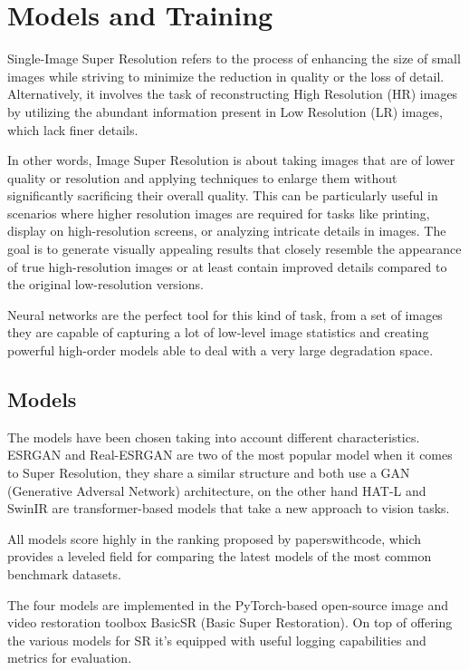 \chapter{Models and Training}
\label{cha:models_training}

Single-Image Super Resolution refers to the process of enhancing the size of small images while striving to minimize the reduction in quality or the loss of detail. Alternatively, it involves the task of reconstructing High Resolution (HR) images by utilizing the abundant information present in Low Resolution (LR) images, which lack finer details.

In other words, Image Super Resolution is about taking images that are of lower quality or resolution and applying techniques to enlarge them without significantly sacrificing their overall quality. This can be particularly useful in scenarios where higher resolution images are required for tasks like printing, display on high-resolution screens, or analyzing intricate details in images. The goal is to generate visually appealing results that closely resemble the appearance of true high-resolution images or at least contain improved details compared to the original low-resolution versions.

Neural networks are the perfect tool for this kind of task, from a set of images they are capable of capturing a lot of low-level image statistics and creating powerful high-order models able to deal with a very large degradation space.

\section{Models}
\label{sec:models}

The models have been chosen taking into account different characteristics. ESRGAN and Real-ESRGAN are two of the most popular model when it comes to Super Resolution, they share a similar structure and both use a GAN (Generative Adversal Network) architecture, on the other hand HAT-L and SwinIR are transformer-based models that take a new approach to vision tasks.

All models score highly in the ranking proposed by paperswithcode\cite{pwcode}, which provides a leveled field for comparing the latest models of the most common benchmark datasets.

The four models are implemented in the PyTorch-based open-source image and video restoration toolbox BasicSR (Basic Super Restoration). On top of offering the various models for SR it's equipped with useful logging capabilities and metrics for evaluation.



